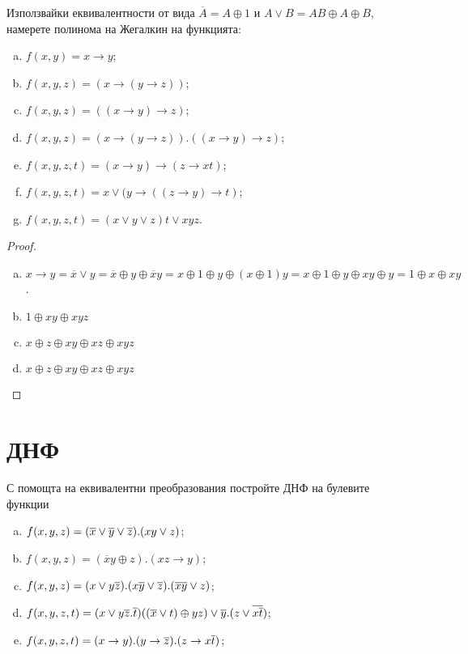 \begin{problem}
  Използвайки еквивалентности от вида $\overline{A} = A\oplus 1$ и $A\vee B = AB\oplus A\oplus B$, 
  намерете полинома на Жегалкин на функцията:
  \begin{enumerate}[a)]
  \item
    $f(x,y) = x\rightarrow y$;
  \item
    $f(x,y,z) = (x\rightarrow (y\rightarrow z))$;
  \item
    $f(x,y,z) = ((x\rightarrow y)\rightarrow z)$;
  \item
    $f(x,y,z) = (x\rightarrow (y\rightarrow z)).((x\rightarrow y)\rightarrow z)$;
  \item
    $f(x,y,z,t) = (x\rightarrow y)\rightarrow (z\rightarrow xt)$;
  \item
    $f(x,y,z,t) = x\vee (y\rightarrow ((z\rightarrow y)\rightarrow t)$;
  \item
    $f(x,y,z,t) = (x\vee y\vee z)t \vee xyz$.
  \end{enumerate}
\end{problem}
\begin{proof}
  \begin{enumerate}[a)]
  \item
    $x\rightarrow y = \overline{x}\vee y = \overline{x}\oplus y \oplus \overline{x}y = x\oplus 1 \oplus y \oplus (x\oplus 1)y = 
    x\oplus 1 \oplus y \oplus xy \oplus y = 1 \oplus x \oplus xy$.
  \item
    $1 \oplus xy \oplus xyz$
  \item
    $x\oplus z\oplus xy\oplus xz \oplus xyz$
  \item
    $x\oplus z\oplus xy\oplus xz \oplus xyz$
  \end{enumerate}
\end{proof}

\section{ДНФ}

\begin{problem} %
  С помощта на еквивалентни преобразования постройте ДНФ на булевите функции
  \begin{enumerate}[a)]
  \item
    $f(x,y,z) = (\overline{x}\vee\overline{y}\vee\overline{z}).(xy\vee z)$;
  \item
    $f(x,y,z) = (\overline{x}y\oplus z).(xz\rightarrow y)$;
  \item
    $f(x,y,z) = (x\vee y\overline{z}).(x\overline{y}\vee\overline{z}).(\overline{xy}\vee z)$;
  \item
    $f(x,y,z,t) = (x\vee y\overline{z}.\overline{t})((\overline{x}\vee t)\oplus yz)\vee \overline{y}.(z\vee \overline{x\overline{t}})$;
  \item
    $f(x,y,z,t) = (x\rightarrow y).(y\rightarrow \overline{z}).(z\rightarrow x\overline{t})$;
  \end{enumerate}
\end{problem}

